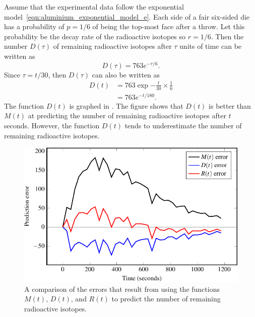 \documentclass[a4paper,oneside,12pt]{article}
\begin{document}
\begin{problem}
{\begin{solution}
Assume that the experimental data follow the exponential
model~\eqref{eqn:aluminium_exponential_model_e}.  Each side of a fair
six-sided die has a probability of $p = 1 / 6$ of being the top-most
face after a throw.  Let this probability be the decay rate of the
radioactive isotopes so $r = 1 / 6$.  Then the number $D(\tau)$ of
remaining radioactive isotopes after $\tau$ units of time can be
written as
\[
D(\tau)
=
763 e^{-\tau / 6}.
\]
Since $\tau = t / 30$, then $D(\tau)$ can also be written as
\begin{equation}
\label{eqn:aluminium_dice_probability}
\begin{aligned}
D(t)
&=
763 \exp{-\frac{t}{30} \times \frac{1}{6}} \\[4pt]
&=
763 e^{-t / 180}.
\end{aligned}
\end{equation}
The function $D(t)$ is graphed in
.  The figure shows that
$D(t)$ is better than $M(t)$ at predicting the number of remaining
radioactive isotopes after $t$ seconds.  However, the function $D(t)$
tends to underestimate the number of remaining radioactive isotopes.

\begin{figure}[!htbp]
\centering
\includegraphics[scale=1.1]{image/11/aluminium-error.pdf}
\caption{%
  A comparison of the errors that result from using the functions
  $M(t)$, $D(t)$, and $R(t)$ to predict the number of remaining
  radioactive isotopes.
}
\label{fig:aluminium_error_analysis}
\end{figure}


\end{solution}}
\end{problem}
\end{document}
